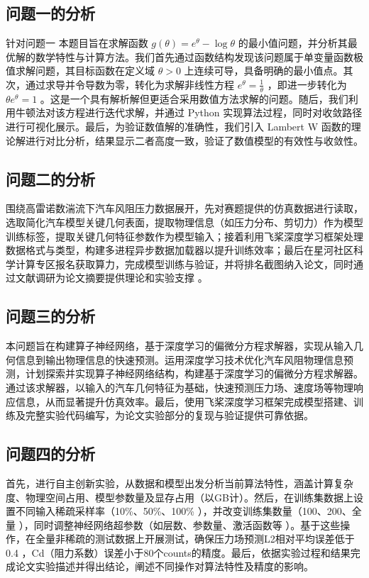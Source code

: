 \documentclass{MMCStyle}
\begin{document}
	\subsection{问题一的分析}
针对问题一
本题目旨在求解函数 $g(\theta)=e^\theta-\log\theta$ 的最小值问题，并分析其最优解的数学特性与计算方法。我们首先通过函数结构发现该问题属于单变量函数极值求解问题，其目标函数在定义域 $\theta > 0$ 上连续可导，具备明确的最小值点。其次，通过求导并令导数为零，转化为求解非线性方程 $ e^\theta = \frac{1}{\theta}$ ，即进一步转化为$\theta e^\theta = 1$ 。这是一个具有解析解但更适合采用数值方法求解的问题。随后，我们利用牛顿法对该方程进行迭代求解，并通过 Python 实现算法过程，同时对收敛路径进行可视化展示。最后，为验证数值解的准确性，我们引入 Lambert W 函数的理论解进行对比分析，结果显示二者高度一致，验证了数值模型的有效性与收敛性。
	\subsection{问题二的分析}
围绕高雷诺数湍流下汽车风阻压力数据展开，先对赛题提供的仿真数据进行读取，选取简化汽车模型关键几何表面，提取物理信息（如压力分布、剪切力）作为模型训练标签，提取关键几何特征参数作为模型输入；接着利用飞桨深度学习框架处理数据格式与类型，构建多进程异步数据加载器以提升训练效率；最后在星河社区科学计算专区报名获取算力，完成模型训练与验证，并将排名截图纳入论文，同时通过文献调研为论文摘要提供理论和实验支撑 。
	\subsection{问题三的分析}
本问题旨在构建算子神经网络，基于深度学习的偏微分方程求解器，实现从输入几何信息到输出物理信息的快速预测。运用深度学习技术优化汽车风阻物理信息预测，计划探索并实现算子神经网络结构，构建基于深度学习的偏微分方程求解器。通过该求解器，以输入的汽车几何特征为基础，快速预测压力场、速度场等物理响应信息，从而显著提升仿真效率。最后，使用飞桨深度学习框架完成模型搭建、训练及完整实验代码编写，为论文实验部分的复现与验证提供可靠依据。
        \subsection{问题四的分析}
首先，进行自主创新实验，从数据和模型出发分析当前算法特性，涵盖计算复杂度、物理空间占用、模型参数量及显存占用（以GB计）。然后，在训练集数据上设置不同输入稀疏采样率（10\%、50\%、100\% ），并改变训练集数量（100、200、全量 ），同时调整神经网络超参数（如层数、参数量、激活函数等 ）。基于这些操作，在全量非稀疏的测试数据上开展测试，确保压力场预测L2相对平均误差低于0.4 ，Cd（阻力系数）误差小于80个counts的精度。最后，依据实验过程和结果完成论文实验描述并得出结论，阐述不同操作对算法特性及精度的影响。 
\end{document}
